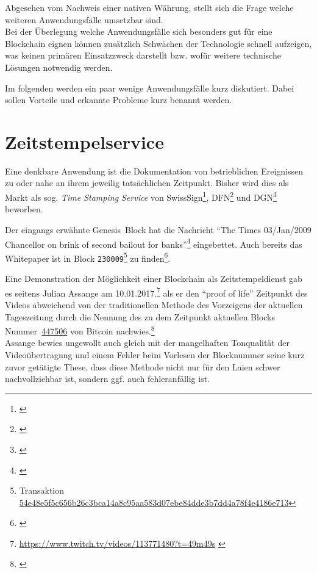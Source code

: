 Abgesehen vom Nachweis einer nativen Währung, stellt sich die Frage welche weiteren Anwendungsfälle umsetzbar sind. \\
Bei der Überlegung welche Anwendungsfälle sich besonders gut für eine Blockchain eignen können zusätzlich Schwächen der Technologie schnell aufzeigen, was keinen primären Einsatzzweck darstellt bzw. wofür weitere technische Lösungen notwendig werden.


Im folgenden werden ein paar wenige Anwendungsfälle kurz diskutiert. Dabei sollen Vorteile und erkannte Probleme kurz benannt werden.

\section{Zeitstempelservice}\label{uc:timestamping}

Eine denkbare Anwendung ist die Dokumentation von betrieblichen Ereignissen zu oder nahe an ihrem jeweilig tatsächlichen Zeitpunkt.
Bisher wird dies als Markt als sog. \emph{Time Stamping Service} von \ua{} SwissSign\footnote{\cite{w:swisssign:timestamtservice}}, \gls{DFN}\footnote{\cite{w:dfn:timestamtservice}} und \gls{DGN}\footnote{\cite{w:dgn:timestamtservice}} beworben.

Der eingangs erwähnte Genesis~Block hat die Nachricht \enquote{The Times 03/Jan/2009 Chancellor on brink of second bailout for banks}\footnote{\cite{w:blog:shirriff}} eingebettet.
Auch bereits das Whitepaper \autocite{p:bitcoin} ist in Block \texttt{230009}\footnote{Transaktion \href{https://blockchain.info/tx/54e48e5f5c656b26c3bca14a8c95aa583d07ebe84dde3b7dd4a78f4e4186e713}{54e48e5f5c656b26c3bca14a8c95aa583d07ebe84dde3b7dd4a78f4e4186e713}} zu finden\footnote{\cite{w:bitcoin:storeddata}}.

Eine Demonstration der Möglichkeit einer Blockchain als Zeitstempeldienst gab es seitens Julian Assange am 10.01.2017.\footnote{\url{https://www.twitch.tv/videos/113771480?t=49m49s} \cite{w:twitch:assange:timestamping}} als er den \enquote{proof of life} Zeitpunkt des Videos abweichend von der traditionellen Methode des Vorzeigens der aktuellen Tageszeitung durch die Nennung des zu dem Zeitpunkt aktuellen Blocks Nummer~\href{https://blockchain.info/block/00000000000000000178374f687728789caa92ecb49b4d850dfc173a7c0351e6}{447506} von Bitcoin nachwies.\footnote{\cite{w:twitch:assange:timestamping}} \\
Assange bewies ungewollt auch gleich mit der mangelhaften Tonqualität der Videoübertragung und einem Fehler beim Vorlesen der Blocknummer seine kurz zuvor getätigte These, dass diese Methode nicht nur für den Laien schwer nachvollziehbar ist, sondern ggf. auch fehleranfällig ist.

